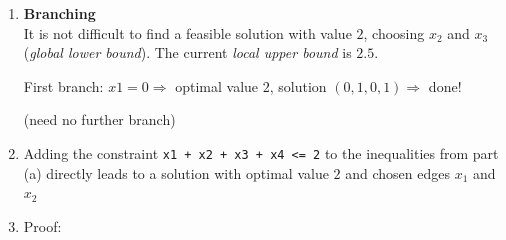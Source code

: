 \documentclass[a4paper, oneside]{scrartcl}
\begin{document}
\begin{enumerate}
  \item \textbf{Branching}\\
        It is not difficult to find a feasible solution with value $2$, choosing $x_2$ and $x_3$
        (\emph{global lower bound}). The current \emph{local upper bound} is $2.5$.
        
        First branch: $x1 = 0 \Rightarrow$ optimal value $2$, solution $(0,1,0,1) \Rightarrow$ done!
        
        (need no further branch)
  
  \item Adding the constraint \texttt{x1 + x2 + x3 + x4 <= 2} to the inequalities from part (a) 
        directly leads to a solution with optimal value $2$ and chosen edges $x_1$ and $x_2$
  
  \item Proof:


\end{enumerate}
\end{document}
